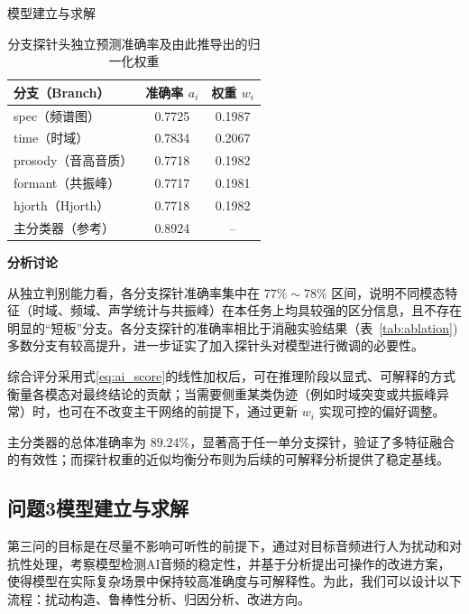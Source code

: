 \documentclass[aspectratio=169]{beamer}
\providecommand{\paragraph}[1]{\smallskip\textbf{#1}\par}
\begin{document}
\begin{frame}{模型建立与求解}
\begin{table}[htbp]
\centering
\caption{分支探针头独立预测准确率及由此推导出的归一化权重}
\label{tab:probe-acc-weight}
\begin{tabular}{lcc}
\toprule
分支（Branch） & 准确率 $a_i$ & 权重 $w_i$ \\
\midrule
spec（频谱图）      & 0.7725 & 0.1987 \\
time（时域）        & 0.7834 & 0.2067 \\
prosody（音高音质） & 0.7718 & 0.1982 \\
formant（共振峰）   & 0.7717 & 0.1981 \\
hjorth（Hjorth）    & 0.7718 & 0.1982 \\
\midrule
主分类器（参考）    & 0.8924 & -- \\
\bottomrule
\end{tabular}
\end{table}

\paragraph{分析讨论}\par

从独立判别能力看，各分支探针准确率集中在 $77\%\sim78\%$ 区间，说明不同模态特征（时域、频域、声学统计与共振峰）在本任务上均具较强的区分信息，且不存在明显的“短板”分支。各分支探针的准确率相比于消融实验结果（表~\ref{tab:ablation})多数分支有较高提升，进一步证实了加入探针头对模型进行微调的必要性。

综合评分采用式\ref{eq:ai_score}的线性加权后，可在推理阶段以显式、可解释的方式衡量各模态对最终结论的贡献；当需要侧重某类伪迹（例如时域突变或共振峰异常）时，也可在不改变主干网络的前提下，通过更新 $w_i$ 实现可控的偏好调整。

主分类器的总体准确率为 $89.24\%$，显著高于任一单分支探针，验证了多特征融合的有效性；而探针权重的近似均衡分布则为后续的可解释分析提供了稳定基线。


\subsection{问题3模型建立与求解}

第三问的目标是在尽量不影响可听性的前提下，通过对目标音频进行人为扰动和对抗性处理，考察模型检测AI音频的稳定性，并基于分析提出可操作的改进方案，使得模型在实际复杂场景中保持较高准确度与可解释性。为此，我们可以设计以下流程：扰动构造、鲁棒性分析、归因分析、改进方向。



\end{frame}
\end{document}
